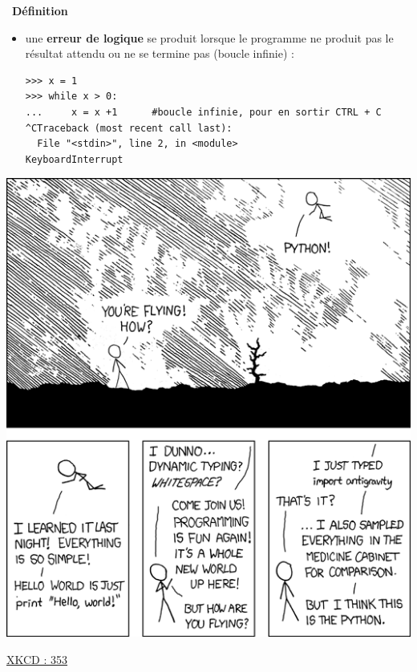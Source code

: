 \documentclass[a4paper, french, 12pt]{article}  %
\newcounter{def}
\newenvironment{definition}[1]
{\par \medskip   \addtocounter{def}{1} \noindent  
\begin{bclogo}[arrondi =0.1,  ombre = true, barre=none, logo=\bcbook, marge=4]{~\textbf{Définition} \textbf{\thedef} {\itshape #1} }  \par}
{
\end{bclogo}
 \par \bigskip }
\newcounter{prog}
\newcounter{logi}
\begin{document}
\begin{definition}{}
\begin{itemize}
	
\item une \textbf{erreur de logique} se produit lorsque le programme ne produit pas le résultat attendu ou ne se termine pas (boucle infinie) :


		\begin{lstlisting}[style=compil]
>>> x = 1
>>> while x > 0:
...     x = x +1      #boucle infinie, pour en sortir CTRL + C
^CTraceback (most recent call last):
  File "<stdin>", line 2, in <module>
KeyboardInterrupt

	\end{lstlisting}
	
\end{itemize}



\end{definition}


\begin{center}
\includegraphics[scale=0.55]{ressources/python.png}

\href{https://www.explainxkcd.com/wiki/index.php/353:_Python}{XKCD : 353}
\end{center}

\newpage

\tableofcontents

 
\end{document}
